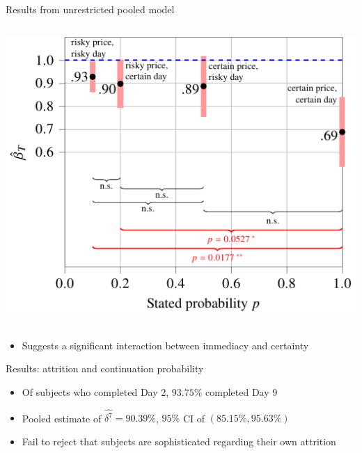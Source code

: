 \documentclass[professionalfont,10pt]{beamer}
\begin{document}
\begin{frame}{Results from unrestricted pooled model}
\begin{columns}[T]
\begin{column}[c]{0.6\textwidth}
  \includegraphics[width=\textwidth]{latex_figures/beta_by_treatment--stated_prob.pdf}
\end{column}%
\end{columns}
\vspace{1\baselineskip}
\pause
\begin{itemize}
\item Suggests a significant interaction between immediacy and certainty
\end{itemize}
\end{frame}

\begin{frame}{Results: attrition and continuation probability}
\begin{itemize}
\item Of subjects who completed Day 2, $93.75\%$ completed Day 9
\vspace{1\baselineskip}
\item Pooled estimate of $\hat{\delta^7}=90.39\%$, $95\%$ CI of $(85.15\%, 95.63\%)$
\vspace{1\baselineskip}
\item Fail to reject that subjects are sophisticated regarding their own attrition
\end{itemize}
\end{frame}
\end{document}
